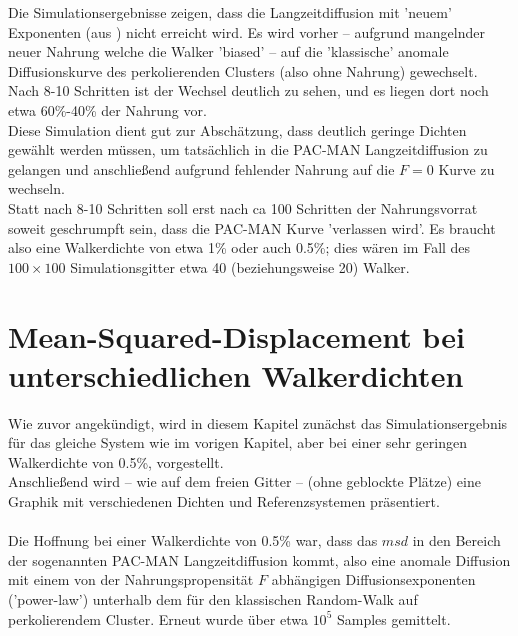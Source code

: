 \documentclass[a4paper, 12pt]{report}
\begin{document}
\noindent Die Simulationsergebnisse zeigen, dass die Langzeitdiffusion mit 'neuem' Exponenten (aus \cite{doi:10.1063/1.4999485}) nicht erreicht wird. Es wird vorher -- aufgrund mangelnder neuer Nahrung welche die Walker 'biased' -- auf die 'klassische' anomale Diffusionskurve des perkolierenden Clusters (also ohne Nahrung) gewechselt. Nach 8-10 Schritten ist der Wechsel deutlich zu sehen, und es liegen dort noch etwa 60\%-40\% der Nahrung vor. 
\\
Diese Simulation dient gut zur Abschätzung, dass deutlich geringe Dichten gewählt werden müssen, um tatsächlich in die PAC-MAN Langzeitdiffusion zu gelangen und anschließend aufgrund fehlender Nahrung auf die $F=0$ Kurve zu wechseln. 
\\
Statt nach 8-10 Schritten soll erst nach ca 100 Schritten der Nahrungsvorrat soweit geschrumpft sein, dass die PAC-MAN Kurve 'verlassen wird'. Es braucht also eine Walkerdichte von etwa 1\% oder auch 0.5\%; dies wären im Fall des $100\times100$ Simulationsgitter etwa 40 (beziehungsweise 20) Walker.


\section{Mean-Squared-Displacement bei unterschiedlichen Walkerdichten} 
Wie zuvor angekündigt, wird in diesem Kapitel zunächst das Simulationsergebnis für das gleiche System wie im vorigen Kapitel, aber bei einer sehr geringen Walkerdichte von 0.5\%, vorgestellt.
\\
Anschließend wird -- wie auf dem freien Gitter -- (ohne geblockte Plätze) eine Graphik mit verschiedenen Dichten und Referenzsystemen präsentiert.
\\
\\
Die Hoffnung bei einer Walkerdichte von 0.5\% war, dass das $msd$ in den Bereich der sogenannten PAC-MAN Langzeitdiffusion kommt, also eine anomale Diffusion mit einem von der Nahrungspropensität $F$ abhängigen Diffusionsexponenten ('power-law') unterhalb dem für den klassischen Random-Walk auf perkolierendem Cluster. Erneut wurde über etwa $10^5$ Samples gemittelt.
\end{document}
